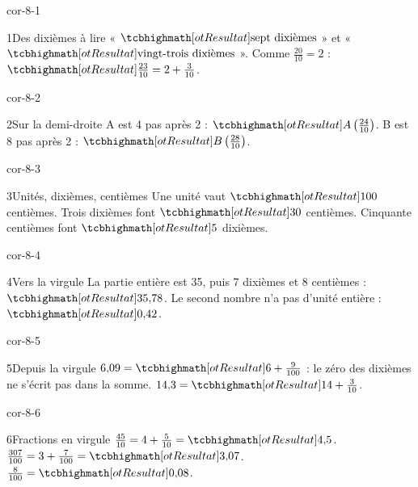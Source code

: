 \clearpage\pagestyle{otMain}\setlength{\otBlocEspacement}{2.5mm}\fontsize{11}{15}\selectfont{}
\begin{blocLivre}{cor-8-1}\begin{corrige}{1}{Des dixièmes à lire}
« $\res{\text{sept dixièmes}}$ » et « $\res{\text{vingt-trois dixièmes}}$ ». Comme $\frac{20}{10}=2$ : $\res{\frac{23}{10}=2+\frac3{10}}$.
\end{corrige}\end{blocLivre}
\begin{blocLivre}{cor-8-2}\begin{corrige}{2}{Sur la demi-droite}
A est 4 pas après 2 : $\res{A\left(\frac{24}{10}\right)}$. B est 8 pas après 2 : $\res{B\left(\frac{28}{10}\right)}$.
\label{fig-cor-8-2}
\end{corrige}\end{blocLivre}
\begin{blocLivre}{cor-8-3}\begin{corrige}{3}{Unités, dixièmes, centièmes}
Une unité vaut $\res{100}$ centièmes. Trois dixièmes font $\res{30}$ centièmes. Cinquante centièmes font $\res5$ dixièmes.
\end{corrige}\end{blocLivre}
\begin{blocLivre}{cor-8-4}\begin{corrige}{4}{Vers la virgule}
La partie entière est 35, puis 7 dixièmes et 8 centièmes : $\res{35{,}78}$. Le second nombre n’a pas d’unité entière : $\res{0{,}42}$.
\end{corrige}\end{blocLivre}
\begin{blocLivre}{cor-8-5}\begin{corrige}{5}{Depuis la virgule}
$6{,}09=\res{6+\frac9{100}}$ : le zéro des dixièmes ne s’écrit pas dans la somme. $14{,}3=\res{14+\frac3{10}}$.
\end{corrige}\end{blocLivre}
\begin{blocLivre}{cor-8-6}\begin{corrige}{6}{Fractions en virgule}
$\frac{45}{10}=4+\frac5{10}=\res{4{,}5}$. $\frac{307}{100}=3+\frac7{100}=\res{3{,}07}$. $\frac8{100}=\res{0{,}08}$.
\end{corrige}\end{blocLivre}
